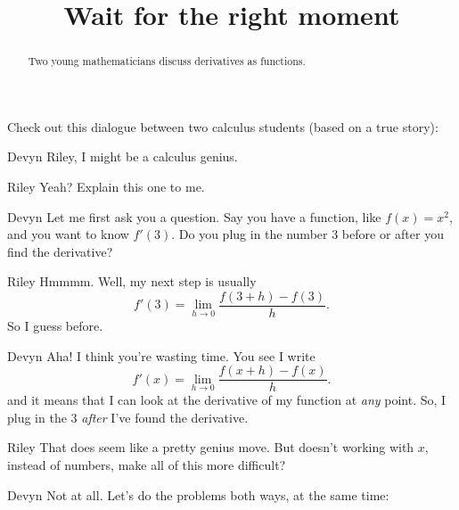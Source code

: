 \documentclass{ximera}
\title[Break-Ground:]{Wait for the right moment}
\begin{document}
\begin{abstract}
Two young mathematicians discuss derivatives as
functions.
\end{abstract}
\maketitle

Check out this dialogue between two calculus students (based on a true
story):

\begin{dialogue}
\item[Devyn] Riley, I might be a calculus genius.
\item[Riley] Yeah?  Explain this one to me.
\item[Devyn] Let me first ask you a question.  Say you have a function, like 
 $f(x) = x^2$, and you want to know $f'(3)$.  Do
  you plug in the number $3$ before or after you find the derivative?
\item[Riley] Hmmmm. Well, my next step is usually
  \[
  f'(3) = \lim_{h\to 0}\frac{f(3+h)-f(3)}{h}.
  \]
  So I guess before.
\item[Devyn] Aha!  I think you're wasting time. You see I write
  \[
  f'(x) = \lim_{h\to 0}\frac{f(x+h)-f(x)}{h}.
  \]
  and it means that I can look at the derivative of my function at
  \textit{any} point.  So, I plug in the $3$ {\em after} I've found the derivative.
\item[Riley] That does seem like a pretty genius move. But doesn't working
 with $x$, instead of numbers, make all of this more difficult?
\item[Devyn] Not at all. Let's do the problems both ways, at the same time:
  \begin{image}
\end{image}
\end{dialogue}
\end{document}
